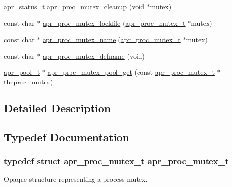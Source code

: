 \begin{DoxyCompactItemize}
\item 
\hyperlink{group__apr__errno_gaf76ee4543247e9fb3f3546203e590a6c}{apr\-\_\-status\-\_\-t} \hyperlink{group__apr__proc__mutex_ga71ec4d283f58e893322f44116e6f8ea2}{apr\-\_\-proc\-\_\-mutex\-\_\-cleanup} (void $\ast$mutex)
\item 
const char $\ast$ \hyperlink{group__apr__proc__mutex_gad4dcc5ec2a5a6ede7be178e13f56377a}{apr\-\_\-proc\-\_\-mutex\-\_\-lockfile} (\hyperlink{group__apr__proc__mutex_ga0fae3a1ab686cd1f252c6062e4c97bd2}{apr\-\_\-proc\-\_\-mutex\-\_\-t} $\ast$mutex)
\item 
const char $\ast$ \hyperlink{group__apr__proc__mutex_ga3e5cf6b6fd0736502efd91312d50881c}{apr\-\_\-proc\-\_\-mutex\-\_\-name} (\hyperlink{group__apr__proc__mutex_ga0fae3a1ab686cd1f252c6062e4c97bd2}{apr\-\_\-proc\-\_\-mutex\-\_\-t} $\ast$mutex)
\item 
const char $\ast$ \hyperlink{group__apr__proc__mutex_gaf4425adc130f83784c552b6bc1563036}{apr\-\_\-proc\-\_\-mutex\-\_\-defname} (void)
\item 
\hyperlink{group__apr__pools_gaf137f28edcf9a086cd6bc36c20d7cdfb}{apr\-\_\-pool\-\_\-t} $\ast$ \hyperlink{group__apr__proc__mutex_ga9d7eda31ec4ad2183ddfcbff2f07daf9}{apr\-\_\-proc\-\_\-mutex\-\_\-pool\-\_\-get} (const \hyperlink{group__apr__proc__mutex_ga0fae3a1ab686cd1f252c6062e4c97bd2}{apr\-\_\-proc\-\_\-mutex\-\_\-t} $\ast$theproc\-\_\-mutex)
\end{DoxyCompactItemize}


\subsection{Detailed Description}


\subsection{Typedef Documentation}
\hypertarget{group__apr__proc__mutex_ga0fae3a1ab686cd1f252c6062e4c97bd2}{
\subsubsection[{apr\-\_\-proc\-\_\-mutex\-\_\-t}]{\setlength{\rightskip}{0pt plus 5cm}typedef struct {\bf apr\-\_\-proc\-\_\-mutex\-\_\-t} {\bf apr\-\_\-proc\-\_\-mutex\-\_\-t}}}\label{group__apr__proc__mutex_ga0fae3a1ab686cd1f252c6062e4c97bd2}
Opaque structure representing a process mutex. 

